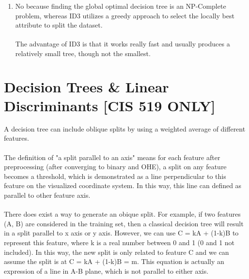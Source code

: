 \documentclass{article}
\begin{document}
\begin{enumerate}[label=\alph*.]
                     
            \item %
            No because finding the global optimal decision 
            tree is an NP-Complete problem, whereas ID3
            utilizes a greedy approach to select the
            locally best attribute to split the dataset.\\
            \\The advantage of ID3 is that it works really
            fast and usually produces a relatively small
            tree, though not the smallest.
        \end{enumerate}
        
       \section{Decision Trees \& Linear Discriminants [CIS 519 ONLY]}
        
        A decision tree can include oblique splits by using  a weighted average of different features. \\\\
        The definition of "a split parallel to an axis" means for each feature after preprocessing (after converging to binary and OHE), a split on any feature becomes a threshold, which is demonstrated as a line perpendicular to this feature on the visualized coordinate system. In this way, this line can defined as parallel to other feature axis.\\\\
        There does exist a way to generate an obique split. For example, if two features (A, B) are considered in the training set, then a classical decision tree will result in a split parallel to x axis or y axis. However, we can use C = kA + (1-k)B to represent this feature, where k is a real number between 0 and 1 (0 and 1 not included). In this way, the new split is only related to feature C and we can assume the split is at C = kA + (1-k)B = m. This equation is actually an expression of a line in A-B plane, which is not parallel to either axis.
        
        
\end{document}
